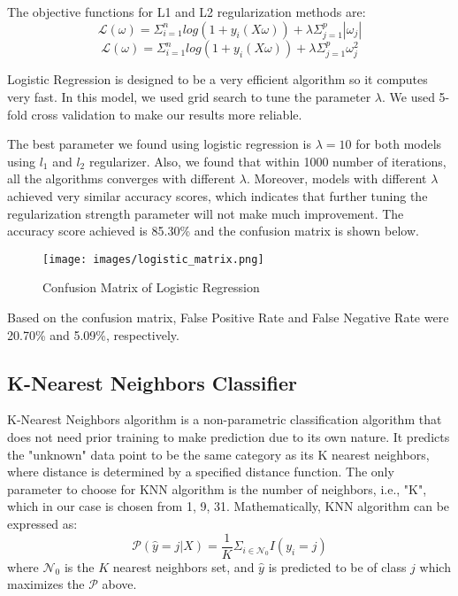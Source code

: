 \documentclass[letterpaper, 10 pt, conference]{ieeeconf}  %
\begin{document}
The objective functions for L1 and L2 regularization methods are:
\begin{equation}
    \mathcal{L}(\omega) = \Sigma_{i=1}^{n}log(1+y_i(X\omega)) + \lambda\Sigma^p_{j=1}|\omega_j|
\end{equation}
\begin{equation}
    \mathcal{L}(\omega) = \Sigma_{i=1}^{n}log(1+y_i(X\omega)) + \lambda\Sigma^p_{j=1}\omega^2_j
\end{equation}

Logistic Regression is designed to be a very efficient algorithm so it computes very fast. In this model, we used grid search to tune the parameter $\lambda$. We used 5-fold cross validation to make our results more reliable.

The best parameter we found using logistic regression is $\lambda = 10$ for both models using $l_1$ and $l_2$ regularizer. Also, we found that within 1000 number of iterations, all the algorithms converges with different $\lambda$. Moreover, models with different $\lambda$ achieved very similar accuracy scores, which indicates that further tuning the regularization strength parameter will not make much improvement. The accuracy score achieved is 85.30\% and the confusion matrix is shown below.

\begin{figure}[H]
    \centering
    \texttt{[image: images/logistic\_matrix.png]}
    \caption{Confusion Matrix of Logistic Regression}
\end{figure}

Based on the confusion matrix, False Positive Rate and False Negative Rate were 20.70\% and 5.09\%, respectively. 

\subsection{K-Nearest Neighbors Classifier}
K-Nearest Neighbors algorithm is a non-parametric classification algorithm that does not need prior training to make prediction due to its own nature. It predicts the "unknown" data point to be the same category as its K nearest neighbors, where distance is determined by a specified distance function. The only parameter to choose for KNN algorithm is the number of neighbors, i.e., "K", which in our case is chosen from 1, 9, 31. Mathematically, KNN algorithm can be expressed as:
\begin{equation}
    \mathcal{P}(\hat{y} = j|X)=\frac{1}{K}\Sigma_{i\in \mathcal{N_0}}I(y_i=j)
\end{equation}
where $\mathcal{N_0}$ is the $K$ nearest neighbors set, and $\hat{y}$ is predicted to be of class $j$ which maximizes the $\mathcal{P}$ above.
\end{document}

